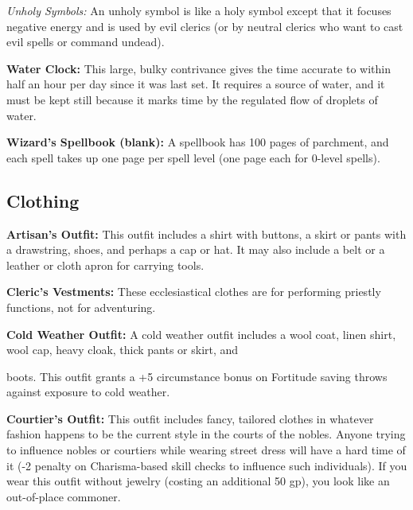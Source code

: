 \textit{Unholy Symbols:} An unholy symbol is like a holy symbol except that it 
focuses negative energy and is used by evil clerics (or by neutral clerics who 
want to cast evil spells or command undead).

\textbf{Water Clock:} This large, bulky contrivance gives the time accurate to 
within half an hour per day since it was last set. It requires a source of water, 
and it must be kept still because it marks time by the regulated flow of droplets 
of water.

\textbf{Wizard's Spellbook (blank):} A spellbook has 100 pages of parchment, and 
each spell takes up one page per spell level (one page each for 0-level spells).

\subsection{Clothing}

\textbf{Artisan's Outfit:} This outfit includes a shirt with buttons, a skirt or 
pants with a drawstring, shoes, and perhaps a cap or hat. It may also include a 
belt or a leather or cloth apron for carrying tools.

\textbf{Cleric's Vestments:} These ecclesiastical clothes are for performing priestly 
functions, not for adventuring.

\textbf{Cold Weather Outfit:} A cold weather outfit includes a wool coat, linen 
shirt, wool cap, heavy cloak, thick pants or skirt, and

boots. This outfit grants a +5 circumstance bonus on Fortitude saving throws against 
exposure to cold weather.

\textbf{Courtier's Outfit:} This outfit includes fancy, tailored clothes in whatever 
fashion happens to be the current style in the courts of the nobles. Anyone trying 
to influence nobles or courtiers while wearing street dress will have a hard time 
of it (-2 penalty on Charisma-based skill checks to influence such individuals). 
If you wear this outfit without jewelry (costing an additional 50 gp), you look 
like an out-of-place commoner.

